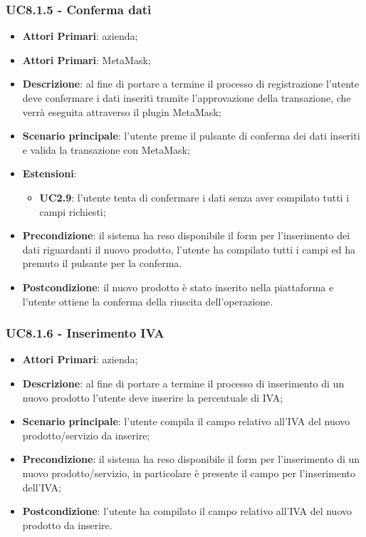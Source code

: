 \subsubsection{UC8.1.5 - Conferma dati}
\begin{itemize}
	\item \textbf{Attori Primari}: azienda;
	\item \textbf{Attori Primari}: MetaMask\glo;
	\item \textbf{Descrizione}: al fine di portare a termine il processo di registrazione l'utente deve confermare i dati inseriti tramite l'approvazione della transazione, che verrà eseguita attraverso il plugin MetaMask\glo;
	\item \textbf{Scenario principale}: l'utente preme il pulsante di conferma dei dati inseriti e valida la transazione con MetaMask\glo;
	\item \textbf{Estensioni}:
	\begin{itemize}
		\item \textbf{UC2.9}: l'utente tenta di confermare i dati senza aver compilato tutti i campi richiesti;
	\end{itemize}
	\item \textbf{Precondizione}: il sistema ha reso disponibile il form per l'inserimento dei dati riguardanti il nuovo prodotto, l'utente ha compilato tutti i campi ed ha premuto il pulsante per la conferma.
	\item \textbf{Postcondizione}: il nuovo prodotto è stato inserito nella piattaforma e l'utente ottiene la conferma della riuscita dell'operazione.
\end{itemize}
\subsubsection{UC8.1.6 - Inserimento IVA}
\begin{itemize}
	\item \textbf{Attori Primari}: azienda;
	\item \textbf{Descrizione}: al fine di portare a termine il processo di inserimento di un nuovo prodotto l'utente deve inserire la percentuale di IVA;
	\item \textbf{Scenario principale}: l'utente compila il campo relativo all'IVA del nuovo prodotto/servizio da inserire;
	\item \textbf{Precondizione}: il sistema ha reso disponibile il form per l'inserimento di un nuovo prodotto/servizio, in particolare è presente il campo per l'inserimento dell'IVA;
	\item \textbf{Postcondizione}: l'utente ha compilato il campo relativo all'IVA del nuovo prodotto da inserire.
\end{itemize}
